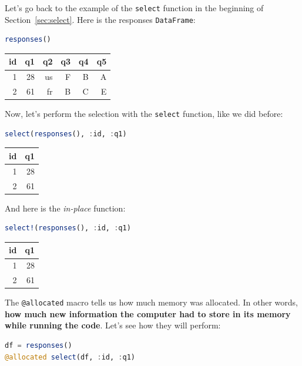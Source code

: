 \documentclass[
  notoc %
]{tufte-book}
\newcommand{\passthrough}[1]{#1}
\begin{document}
Let's go back to the example of the \passthrough{\lstinline!select!}
function in the beginning of Section~\ref{sec:select}. Here is the
responses \passthrough{\lstinline!DataFrame!}:

\begin{lstlisting}[language=Julia]
responses()
\end{lstlisting}

\begin{longtable}[]{@{}rrrrrr@{}}
\toprule
id & q1 & q2 & q3 & q4 & q5 \\
\midrule
\endhead
1 & 28 & us & F & B & A \\
2 & 61 & fr & B & C & E \\
\bottomrule
\end{longtable}

Now, let's perform the selection with the
\passthrough{\lstinline!select!} function, like we did before:

\begin{lstlisting}[language=Julia]
select(responses(), :id, :q1)
\end{lstlisting}

\begin{longtable}[]{@{}rr@{}}
\toprule
id & q1 \\
\midrule
\endhead
1 & 28 \\
2 & 61 \\
\bottomrule
\end{longtable}

And here is the \emph{in-place} function:

\begin{lstlisting}[language=Julia]
select!(responses(), :id, :q1)
\end{lstlisting}

\begin{longtable}[]{@{}rr@{}}
\toprule
id & q1 \\
\midrule
\endhead
1 & 28 \\
2 & 61 \\
\bottomrule
\end{longtable}

The \passthrough{\lstinline!@allocated!} macro tells us how much memory
was allocated. In other words, \textbf{how much new information the
computer had to store in its memory while running the code}. Let's see
how they will perform:

\begin{lstlisting}[language=Julia]
df = responses()
@allocated select(df, :id, :q1)
\end{lstlisting}
\end{document}
